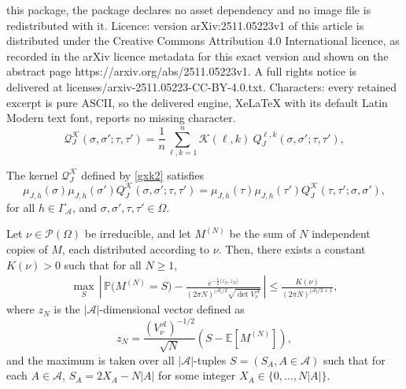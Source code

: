 \documentclass[10pt,a4paper]{amsart}
\let\G=\Gamma
\let\O=\Omega
\let\si=\sigma
\let\t=\tau
\newcommand{\bbP}{{\ensuremath{\mathbb P}} }
\newcommand{\cA}{\ensuremath{\mathcal A}}
\newcommand{\cK}{\ensuremath{\mathcal K}}
\newcommand{\cQ}{\ensuremath{\mathcal Q}}
\renewcommand{\leq}{\le}%
\begin{document}
this package, the package declares no asset dependency and no image file is redistributed with it. Licence: version arXiv:2511.05223v1 of this article is distributed under the Creative Commons Attribution 4.0 International licence, as recorded in the arXiv licence metadata for this exact version and shown on the abstract page https://arxiv.org/abs/2511.05223v1. A full rights notice is delivered at licenses/arxiv-2511.05223-CC-BY-4.0.txt. Characters: every retained excerpt is pure ASCII, so the delivered engine, XeLaTeX with its default Latin Modern text font, reports no missing character.
\begin{equation}\label{gxk2}
    \mathcal{Q}_J^\mathcal{K}(\sigma, \sigma'; \tau, \tau') = \frac1n\sum_{\ell, k = 1}^n \mathcal{K}(\ell, k)\ Q_J^{\ell,k}(\sigma, \sigma'; \tau, \tau'),
\end{equation}

\begin{lemma}\label{lem:db}
The kernel $\cQ_J^\cK$ defined by \eqref{gxk2} satisfies 
\begin{equation}\label{db5}
\mu_{J,h}(\sigma) \mu_{J,h}(\sigma')Q_J^{\cK}(\sigma, \sigma'; \tau, \tau') = \mu_{J,h}(\tau) \mu_{J,h}(\tau') Q_J^{\cK}(\tau, \tau'; \sigma, \sigma'),
\end{equation}
for all $h\in \G_\cA$, and $\si,\si',\t,\t'\in\O$.
\end{lemma}

\begin{proposition}\label{CLT adapted}
Let \(\nu \in \mathcal{P}(\Omega)\) be irreducible, and let $M^{(N)}$ be the sum of $N$ independent copies of $M$, each distributed according to $\nu$. 
Then, there exists a constant \(K(\nu) > 0\) such that for all $N\ge 1$, 
\begin{align*}
\max_{S}\, \left|\, \bbP\big(M^{(N)} = S\big) - \frac{e^{-\frac{1}{2}\langle z_N, z_N \rangle}}{(2\pi N)^{|\mathcal{A}|/2} \sqrt{\det V^\mathcal{A}_\nu}} \,\right| \leq \frac{K(\nu)}{(2\pi N)^{|\mathcal{A}|/2 + 1}},
\end{align*}
where $z_N$ is the \(|\mathcal{A}|\)-dimensional vector defined as
\begin{equation}\label{z_N expression}
z_N = \frac{(V_\nu^{\mathcal{A}})^{-1/2}}{\sqrt{N}} \left(S - \mathbb{E}[M^{(N)}] \right),
\end{equation}
and the maximum is taken over all  \(|\mathcal{A}|\)-tuples \(S=(S_A, A\in\cA)\) such that for each $A\in\cA$, $S_A=2X_A-N|A|$ for some integer
$X_A\in\{0,\dots,N|A|\}$.
\end{proposition}
\end{document}
